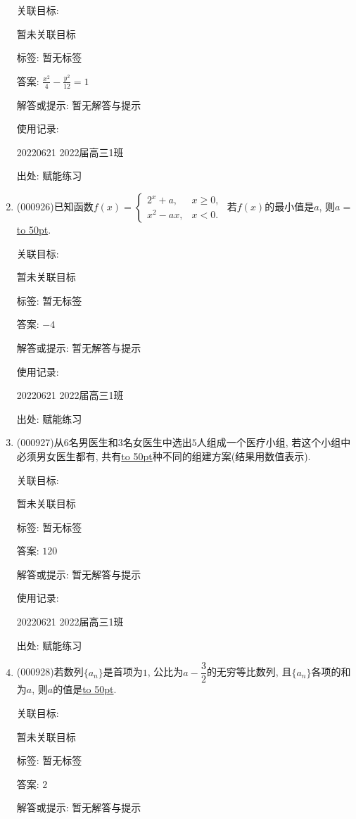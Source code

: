 \documentclass[10pt,a4paper]{article}
\newcommand{\blank}[1]{\underline{\hbox to #1pt{}}}
\begin{document}
\begin{enumerate}[1.]
关联目标:

暂未关联目标



标签: 暂无标签

答案: $\frac{x^2}4-\frac{y^2}{12}=1$

解答或提示: 暂无解答与提示

使用记录:

20220621	2022届高三1班	


出处: 赋能练习
\item { (000926)}已知函数$f(x)=\begin{cases}2^x +a, & x\ge 0, \\ x^2-ax, & x<0.\end{cases}$ 若$f(x)$的最小值是$a$, 则$a=$\blank{50}.


关联目标:

暂未关联目标



标签: 暂无标签

答案: $-4$

解答或提示: 暂无解答与提示

使用记录:

20220621	2022届高三1班	


出处: 赋能练习
\item { (000927)}从$6$名男医生和$3$名女医生中选出$5$人组成一个医疗小组, 若这个小组中必须男女医生都有, 共有\blank{50}种不同的组建方案(结果用数值表示).


关联目标:

暂未关联目标



标签: 暂无标签

答案: $120$

解答或提示: 暂无解答与提示

使用记录:

20220621	2022届高三1班	


出处: 赋能练习
\item { (000928)}若数列$\{a_n\}$是首项为$1$, 公比为$a-\dfrac32$的无穷等比数列, 且$\{a_n\}$各项的和为$a$, 则$a$的值是\blank{50}.


关联目标:

暂未关联目标



标签: 暂无标签

答案: $2$

解答或提示: 暂无解答与提示


\end{enumerate}
\end{document}
